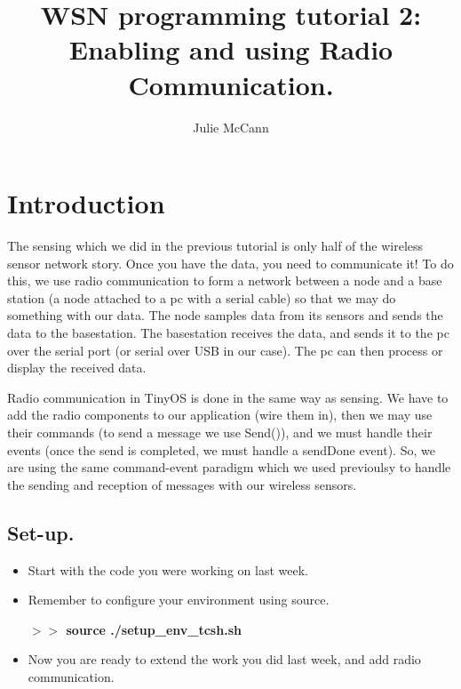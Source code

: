 \documentclass [a4] {article}
\author{Julie McCann}
\title{WSN programming tutorial 2: Enabling and using Radio Communication.}
\begin{document}
\maketitle

\section{Introduction}

The sensing which we did in the previous tutorial is only half of the wireless sensor network story. Once you have the data, you need to communicate it! To do this, we use radio communication to form a network between a node and a base station (a node attached to a pc with a serial cable) so that we may do something with our data. The node samples data from its sensors and sends the data to the basestation. The basestation receives the data, and sends it to the pc over the serial port (or serial over USB in our case). The pc can then process or display the received data. 

Radio communication in TinyOS is done in the same way as sensing. We have to add the radio components to our application (wire them in), then we may use their commands (to send a message we use Send()), and we must handle their events (once the send is completed, we must handle a sendDone event). So, we are using the same command-event paradigm which we used previoulsy to handle the sending and reception of messages with our wireless sensors.

\subsection{Set-up.}

\begin{itemize}

\item Start with the code you were working on last week.

\item Remember to configure your environment using source.

\textbf{$>>$ source ./setup\_env\_tcsh.sh} \\




\item Now you are ready to extend the work you did last week, and add radio communication.

\end{itemize}
\end{document}
